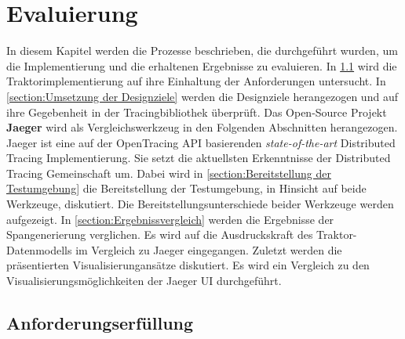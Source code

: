 %

\chapter{Evaluierung}
\label{chapter:Evaluierung}
In diesem Kapitel werden die Prozesse beschrieben, die durchgeführt wurden, um die Implementierung und die erhaltenen Ergebnisse zu evaluieren. In \cref{section:Anforderungserfüllung} wird die Traktorimplementierung auf ihre Einhaltung der Anforderungen  untersucht. In \cref{section:Umsetzung der Designziele} werden die Designziele herangezogen und auf ihre Gegebenheit in der Tracingbibliothek überprüft. Das Open-Source Projekt \textbf{Jaeger} wird als Vergleichswerkzeug in den Folgenden Abschnitten herangezogen. Jaeger ist eine auf der OpenTracing API basierenden \emph{state-of-the-art} Distributed Tracing Implementierung. Sie setzt die aktuellsten Erkenntnisse der Distributed Tracing Gemeinschaft um. Dabei wird in \cref{section:Bereitstellung der Testumgebung} die Bereitstellung der Testumgebung, in Hinsicht auf beide Werkzeuge, diskutiert. Die Bereitstellungsunterschiede beider Werkzeuge werden aufgezeigt. In \cref{section:Ergebnissvergleich} werden die Ergebnisse der Spangenerierung verglichen. Es wird auf die Ausdruckskraft des Traktor-Datenmodells im Vergleich zu Jaeger eingegangen. Zuletzt werden die präsentierten Visualisierungansätze diskutiert. Es wird ein Vergleich zu den Visualisierungsmöglichkeiten der Jaeger UI durchgeführt.

\section{Anforderungserfüllung}
\label{section:Anforderungserfüllung}


